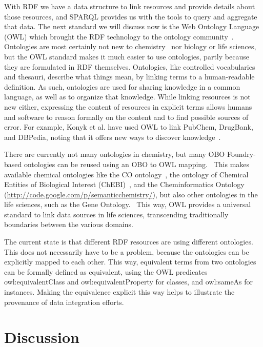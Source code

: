 \documentclass[10pt]{bmc_article}
\newenvironment{bmcformat}{\begin{raggedright}\baselineskip20pt\sloppy\setboolean{publ}{false}}{\end{raggedright}\baselineskip20pt\sloppy}
\begin{document}
\begin{bmcformat}
With RDF we have a data structure to link resources and provide details about
those resources, and SPARQL provides us with the tools to query and aggregate that data.
The next standard we will discuss now is the Web Ontology
Language (OWL) which brought the RDF technology to the ontology community~\cite{GUN2004}.
Ontologies are most certainly not new to chemistry~\cite{Gordon1988} nor biology or life sciences,
but the OWL standard makes it much easier to use ontologies, partly because
they are formulated in RDF themselves. Ontologies, like
controlled vocabularies and thesauri, describe what things mean, by linking
terms to a human-readable definition. As such, ontologies are used for sharing
knowledge in a common language, as well as to organize that knowledge.
While linking resources is not new either, expressing the content of resources
in explicit terms allows humans and software to reason formally on the content and to find possible sources of error.
For example, Konyk et al. have used OWL to link PubChem,
DrugBank, and DBPedia, noting that it offers new ways to
discover knowledge~\cite{Konyk2008}.


There are currently not many ontologies in chemistry, but many OBO Foundry-based
ontologies can be reused using an OBO to OWL mapping.~\cite{Moreira2007} This makes
available chemical ontologies like the CO ontology~\cite{Feldman2005},
the ontology of Chemical Entities of Biological Interest (ChEBI)~\cite{Degtyarenko2008,Hull2008},
and the Cheminformatics Ontology (\url{http://code.google.com/p/semanticchemistry/}),
but also other ontologies in the life sciences, such as the Gene Ontology.~\cite{Aranguren2007}
This way, OWL provides a universal standard to link data sources in life
sciences, transcending traditionally boundaries between the various domains.

The current state is that different RDF resources are using different ontologies.
This does not necessarily have to be a problem, because the ontologies can be
explicitly mapped to each other. This way, equivalent terms from two ontologies
can be formally defined as equivalent, using the OWL predicates owl:equivalentClass
and owl:equivalentProperty for classes, and owl:sameAs for instances.
Making the equivalence explicit this way helps to illustrate the provenance of data integration efforts. 


\section{Discussion}


\end{bmcformat}
\end{document}
